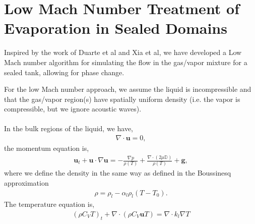 \documentclass[]{article}
\begin{document}
\section*{Low Mach Number Treatment of Evaporation in Sealed Domains} 
Inspired by the work of Duarte et al\cite{DUARTE2015} and
Xia et al\cite{XiaLuTryggvason2018}, we have developed a Low Mach 
number algorithm for simulating the flow in the gas/vapor mixture for
a sealed tank, allowing for phase change.  
\par
For the low Mach number approach, we assume the liquid is 
incompressible and that the gas/vapor region(s) have spatially 
uniform density (i.e. the vapor is compressible, 
but we ignore acoustic waves).\\\\
In the bulk regions of the liquid, we have,
\begin{eqnarray*}
\nabla \cdot \bm{u} = 0,
\end{eqnarray*}
the momentum equation is,
\begin{eqnarray*}
\displaystyle \bm{u}_t +\bm{u}\cdot\nabla\bm{u} = 
-\frac{\nabla p}{\rho(T)} +
\frac{\nabla\cdot(2\mu \mathbb{D})}{\rho(T)}+\bm{g},
\end{eqnarray*}
where we define the density in the same way as defined in the 
Boussinesq approximation 
\begin{eqnarray*}
\rho = \rho_l - \alpha_l\rho_l(T-T_{0}).
\end{eqnarray*}
The temperature equation is,
\begin{eqnarray*}
(\rho C_V T)_t + \nabla\cdot(\rho C_V\bm{u}T) = \nabla\cdot k_l\nabla T
\end{eqnarray*}
\end{document}
